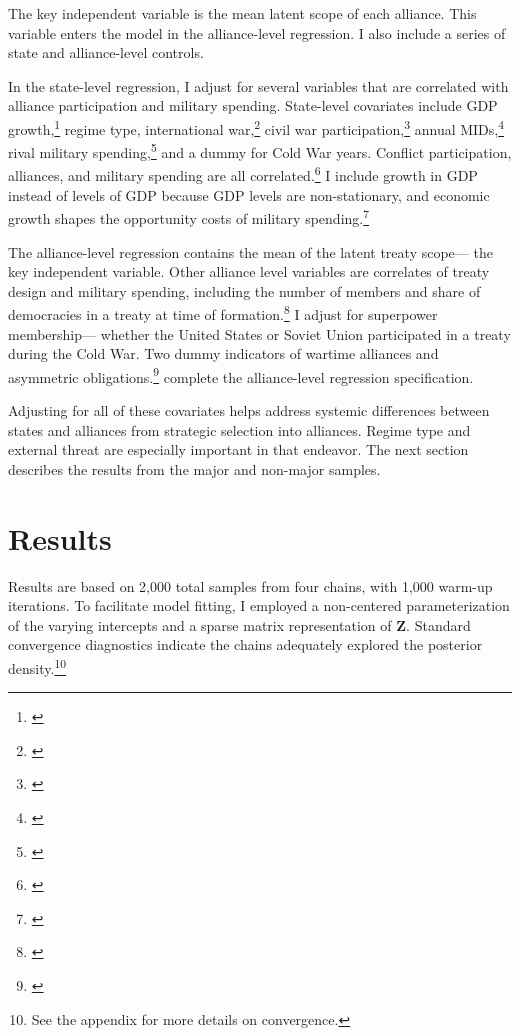 \documentclass[12pt]{article}
\begin{document}
The key independent variable is the mean latent scope of each alliance. 
This variable enters the model in the alliance-level regression. 
I also include a series of state and alliance-level controls. 


In the state-level regression, I adjust for several variables that are correlated with alliance participation and military spending. 
State-level covariates include GDP growth,\footnote{\citep{Boltetal2018}} regime type, international war,\footnote{\citep{Reiteretal2016}} civil war participation,\footnote{\citep{SarkeesWayman2010}} annual MIDs,\footnote{\citep{Gibleretal2016}} rival military spending,\footnote{\citep{ThompsonDreyer2012}} and a dummy for Cold War years.
Conflict participation, alliances, and military spending are all correlated.\footnote{\citep{SeneseVasquez2008}}
I include growth in GDP instead of levels of GDP because GDP levels are non-stationary, and economic growth shapes the opportunity costs of military spending.\footnote{\citep{Kimball2010, Zielinskietal2017}} 


The alliance-level regression contains the mean of the latent treaty scope--- the key independent variable. 
Other alliance level variables are correlates of treaty design and military spending, including the number of members and share of democracies in a treaty at time of formation.\footnote{\citep{Chibaetal2015}} 
I adjust for superpower membership--- whether the United States or Soviet Union participated in a treaty during the Cold War. 
Two dummy indicators of wartime alliances and asymmetric obligations.\footnote{\citep{Leedsetal2002}} complete the alliance-level regression specification. 


Adjusting for all of these covariates helps address systemic differences between states and alliances from strategic selection into alliances. 
Regime type and external threat are especially important in that endeavor. 
The next section describes the results from the major and non-major samples.
 

\section{Results}


Results are based on 2,000 total samples from four chains, with 1,000 warm-up iterations. 
To facilitate model fitting, I employed a non-centered parameterization of the varying intercepts and a sparse matrix representation of \textbf{Z}. 
Standard convergence diagnostics indicate the chains adequately explored the posterior density.\footnote{See the appendix for more details on convergence.} 
\end{document}
